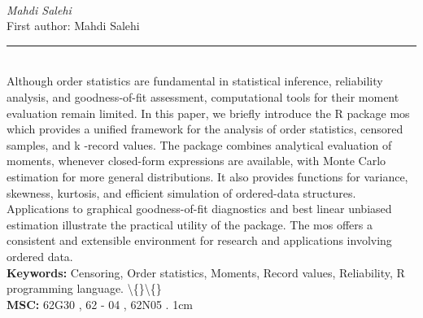 \documentclass[10pt,twoside]{article}
\begin{document}
\noindent\begin{minipage}[t][\textheight]{\textwidth}
\\[0.35em]
{\itshape Mahdi Salehi}\\[0.2em]
{\footnotesize First author: Mahdi Salehi}\\[0.45em]
\noindent\rule{\textwidth}{0.3pt}\\[0.4em]
{\footnotesize  Although order statistics are fundamental in statistical inference, reliability analysis, and goodness-of-fit assessment, computational tools for their moment evaluation remain limited. In this paper, we briefly introduce the R package mos which provides a unified framework for the analysis of order statistics, censored samples, and k -record values. The package combines analytical evaluation of moments, whenever closed-form expressions are available, with Monte Carlo estimation for more general distributions. It also provides functions for variance, skewness, kurtosis, and efficient simulation of ordered-data structures. Applications to graphical goodness-of-fit diagnostics and best linear unbiased estimation illustrate the practical utility of the package. The mos offers a consistent and extensible environment for research and applications involving ordered data.}\\[0.4em]
{\footnotesize\bfseries Keywords:} {\footnotesize Censoring, Order statistics, Moments, Record values, Reliability, R programming language. \textbackslash\{\}\textbackslash\{\}}\\[0.15em]
{\footnotesize\bfseries MSC:} {\footnotesize 62G30 , 62 - 04 , 62N05 . 1cm}\\
\vfill
\end{minipage}
\newpage
\end{document}
